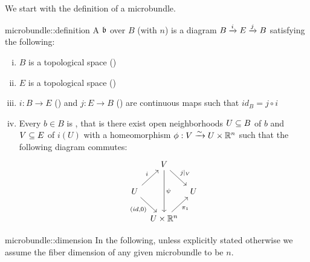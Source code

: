 \begin{myparagraph}
    We start with the definition of a microbundle.
\end{myparagraph}

\begin{mydefinition}[microbundle]{microbundle::definition}
    A  $\bb$ over $B$ (with  $n$) is a diagram $\bundle{B}{E}{i}{j}$ satisfying the following:
    \begin{enumerate}[(i)]
        \item $B$ is a topological space ()
        \item $E$ is a topological space ()
        \item $i: B \to E$ () and $j: E \to B$ () are continuous maps such that $id_B = j \circ i$
        \item Every $b \in B$ is , that is there exist open neighborhoods $U \sub B$ of $b$ and $V \sub E$ of $i(U)$ with a homeomorphism $\phi: V \isomto U \times \R^n$ such that the following diagram commutes:
        \[
            \begin{tikzcd}[column sep=tiny]
                & V \ar[dr, "j\vert_V"] \ar[dd, "\psi"] & \\
                U \ar[ur, "i"] \ar[dr, "{(id, 0)}"'] & & U \\
                & U \times\R^n \ar[ur, "\pi_1"'] &
            \end{tikzcd}
        \]
    \end{enumerate}
\end{mydefinition}

\begin{myremark}{microbundle::dimension}
    In the following, unless explicitly stated otherwise we assume the fiber dimension of any given microbundle to be $n$.
\end{myremark}
